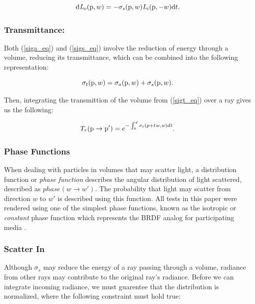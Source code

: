 \documentclass[runningheads]{llncs}
\begin{document}
\begin{equation}
\textup{d}\mathit{L}_{o}(\textup{p},w) = -\sigma_{s}(\textup{p},w) \mathit{L}_{i}(\textup{p},-w)\textup{d}t.
\label{sigs_eq}
\end{equation}

\subsubsection{Transmittance:}
Both (\ref{siga_eq}) and (\ref{sigs_eq}) involve the reduction of energy through a volume, reducing its transmittance, which can be combined into the following representation:

\begin{equation}
\sigma_{t}(\textup{p},w) = \sigma_{a}(\textup{p},w) + \sigma_{s}(\textup{p}, w).
\label{sigt_eq}
\end{equation}

Then, integrating the transmittion of the volume from (\ref{sigt_eq}) over a ray gives us the following:

\begin{equation}
T_{r}(\textup{p} \to \textup{p}') = e^{-\int_{0}^{d}\sigma_{t} (p+t\mathit{w},\mathit{w})d\mathit{t}}.
\label{transmittion_eq}
\end{equation}

\subsubsection{Phase Functions}
When dealing with particles in volumes that may scatter light, a distribution function or \textit{phase function} describes the angular distribution of light scattered, described as $phase(w \to w')$.  The probability that light may scatter from direction $w$ to $w'$ is described using this function.  All tests in this paper were rendered using one of the simplest phase functions, known as the isotropic or \textit{constant} phase function which represents the BRDF analog for participating media \cite{cerezo}.

\subsubsection{Scatter In}
Although $\sigma_{s}$ may reduce the energy of a ray passing through a volume, radiance from other rays may contribute to the original ray's radiance.  Before we can integrate incoming radiance, we must guarentee that the distribution is normalized, where the following constraint must hold true:
\end{document}
